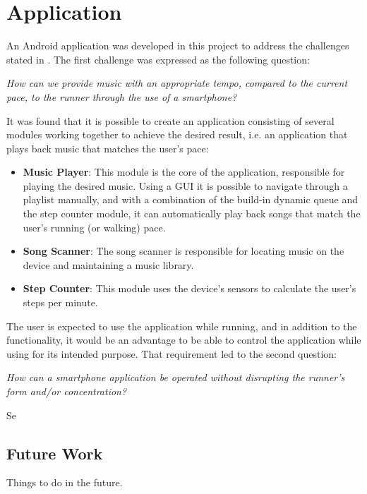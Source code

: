 \section{Application}
An Android application was developed in this project to address the challenges stated in . The first challenge was expressed as the following question:

\begin{center}
\textit{How can we provide music with an appropriate tempo, compared to the current pace, to the runner through the use of a smartphone?}
\end{center}

It was found that it is possible to create an application consisting of several modules working together to achieve the desired result, i.e. an application that plays back music that matches the user's pace:

\begin{itemize}
\item \textbf{Music Player}: This module is the core of the application, responsible for playing the desired music. Using a GUI it is possible to navigate through a playlist manually, and with a combination of the build-in dynamic queue and the step counter module, it can automatically play back songs that match the user's running (or walking) pace.
\item \textbf{Song Scanner}: The song scanner is responsible for locating music on the device and maintaining a music library.
\item \textbf{Step Counter}: This module uses the device's sensors to calculate the user's steps per minute.
\end{itemize}

The user is expected to use the application while running, and in addition to the functionality, it would be an advantage to be able to control the application while using for its intended purpose. That requirement led to the second question:

\begin{center}
\textit{How can a smartphone application be operated without disrupting the runner's form and/or concentration?}
\end{center}

Se


\subsection{Future Work}
Things to do in the future.


